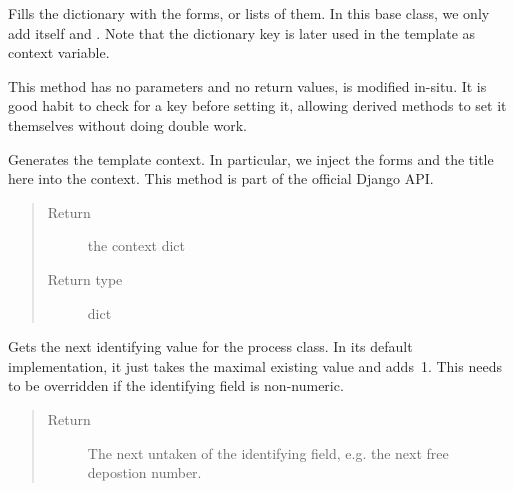 \documentclass[a4paper,11pt,english]{sphinxmanual}
\begin{document}
\begin{fulllineitems}
\begin{fulllineitems}
\label{programming/class-based_views:samples.utils.views.class_views.ProcessWithoutSamplesView.build_forms}
Fills the  dictionary with the forms, or lists of them.  In
this base class, we only add  itself and
.  Note that the dictionary key is later used in
the template as context variable.

This method has no parameters and no return values,  is
modified in-situ.  It is good habit to check for a key before setting
it, allowing derived methods to set it themselves without doing double
work.

\end{fulllineitems}


\begin{fulllineitems}
\label{programming/class-based_views:samples.utils.views.class_views.ProcessWithoutSamplesView.get_context_data}
Generates the template context.  In particular, we inject the forms and the
title here into the context.  This method is part of the official
Django API.
\begin{quote}\begin{description}
\item[{Return}] \leavevmode
the context dict

\item[{Return type}] \leavevmode
dict

\end{description}\end{quote}

\end{fulllineitems}


\begin{fulllineitems}
\label{programming/class-based_views:samples.utils.views.class_views.ProcessWithoutSamplesView.get_next_id}
Gets the next identifying value for the process class.  In its default
implementation, it just takes the maximal existing value and adds 1.
This needs to be overridden if the identifying field is non-numeric.
\begin{quote}\begin{description}
\item[{Return}] \leavevmode
The next untaken of the identifying field, e.g. the next free
depostion number.


\end{description}
\end{quote}
\end{fulllineitems}
\end{fulllineitems}
\end{document}
